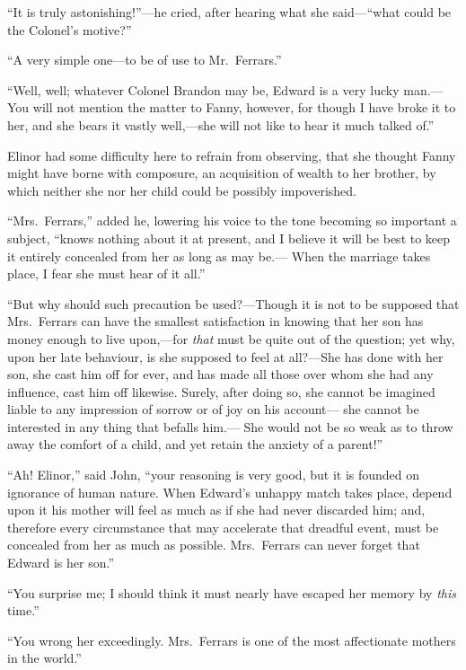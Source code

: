 \documentclass{article}
\begin{document}
``It is truly astonishing!''---he cried, after hearing
what she said---``what could be the Colonel's motive?''

``A very simple one---to be of use to Mr.\ Ferrars.''

``Well, well; whatever Colonel Brandon may be,
Edward is a very lucky man.---You will not mention the matter
to Fanny, however, for though I have broke it to her,
and she bears it vastly well,---she will not like to hear
it much talked of.''

Elinor had some difficulty here to refrain from observing,
that she thought Fanny might have borne with composure,
an acquisition of wealth to her brother, by which neither
she nor her child could be possibly impoverished.

``Mrs.\ Ferrars,'' added he, lowering his voice to the
tone becoming so important a subject, ``knows nothing
about it at present, and I believe it will be best to
keep it entirely concealed from her as long as may be.---%
When the marriage takes place, I fear she must hear
of it all.''

``But why should such precaution be used?---Though
it is not to be supposed that Mrs.\ Ferrars can have
the smallest satisfaction in knowing that her son has
money enough to live upon,---for \emph{that} must be quite
out of the question; yet why, upon her late behaviour,
is she supposed to feel at all?---She has done with her
son, she cast him off for ever, and has made all those
over whom she had any influence, cast him off likewise.
Surely, after doing so, she cannot be imagined liable
to any impression of sorrow or of joy on his account---%
she cannot be interested in any thing that befalls him.---%
She would not be so weak as to throw away the comfort
of a child, and yet retain the anxiety of a parent!''

``Ah! Elinor,'' said John, ``your reasoning is very good,
but it is founded on ignorance of human nature.
When Edward's unhappy match takes place, depend upon it
his mother will feel as much as if she had never discarded him;
and, therefore every circumstance that may accelerate that
dreadful event, must be concealed from her as much as possible.
Mrs.\ Ferrars can never forget that Edward is her son.''

``You surprise me; I should think it must nearly
have escaped her memory by \emph{this} time.''

``You wrong her exceedingly.  Mrs.\ Ferrars is one
of the most affectionate mothers in the world.''
\end{document}
